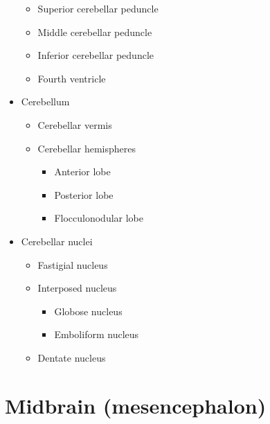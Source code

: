 \begin{itemize}
  \begin{itemize}
  \tightlist
  \item
    Superior cerebellar peduncle
  \item
    Middle cerebellar peduncle
  \item
    Inferior cerebellar peduncle
  \item
    Fourth ventricle
  \end{itemize}
\item
  Cerebellum

  \begin{itemize}
  \tightlist
  \item
    Cerebellar vermis
  \item
    Cerebellar hemispheres

    \begin{itemize}
    \tightlist
    \item
      Anterior lobe
    \item
      Posterior lobe
    \item
      Flocculonodular lobe
    \end{itemize}
  \end{itemize}
\item
  Cerebellar nuclei

  \begin{itemize}
  \tightlist
  \item
    Fastigial nucleus
  \item
    Interposed nucleus

    \begin{itemize}
    \tightlist
    \item
      Globose nucleus
    \item
      Emboliform nucleus
    \end{itemize}
  \item
    Dentate nucleus
  \end{itemize}
\end{itemize}

\hypertarget{midbrain-mesencephalon}{%
\section{Midbrain (mesencephalon)}\label{midbrain-mesencephalon}}

